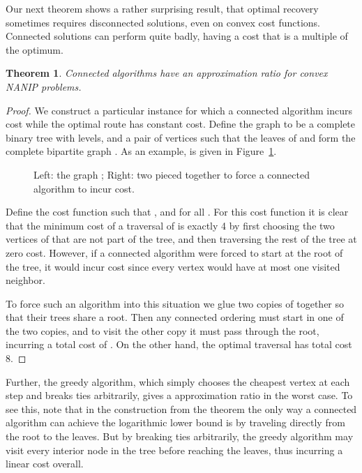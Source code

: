 \documentclass[english]{llncs}
\newtheorem{thm}{Theorem}
\begin{document}
Our next theorem shows a rather surprising result, that optimal recovery
sometimes requires disconnected solutions, even on convex cost functions.
Connected solutions can perform quite badly, having a cost that is a
 multiple of the optimum.

\begin{thm}
Connected algorithms have an approximation ratio  for convex
NANIP problems.
\end{thm}

\begin{proof}

We construct a particular instance for which a connected algorithm incurs cost
 while the optimal route has constant cost. Define the graph
 to be a complete binary tree  with  levels, and a pair of vertices
 such that the leaves of  and  form the complete bipartite
graph . As an example,  is given in Figure~\ref{fig:b3}.

\begin{figure}[th]
\centering
\begin{subfigure}{.5\textwidth}
  \centering
\end{subfigure}\begin{subfigure}{.5\textwidth}
  \centering
\end{subfigure}
\caption{Left: the graph ; Right: two  pieced together to force a
connected algorithm to incur  cost.}
\label{fig:b3}
\end{figure}

Define the cost function  such that , and 
for all . For this cost function it is clear that the minimum cost of
a traversal of  is exactly 4 by first choosing the two vertices of 
that are not part of the tree, and then traversing the rest of the tree at zero
cost. However, if a connected algorithm were forced to start at the root of the
tree, it would incur cost  since every vertex
would have at most one visited neighbor. 

To force such an algorithm into this situation we glue two copies of 
together so that their trees share a root. Then any connected ordering must
start in one of the two copies, and to visit the other copy it must pass
through the root, incurring a total cost of . On the other
hand, the optimal traversal has total cost 8. 

\end{proof}

Further, the greedy algorithm, which simply chooses the cheapest vertex at each
step and breaks ties arbitrarily, gives a  approximation ratio in
the worst case. To see this, note that in the construction from the theorem the
only way a connected algorithm can achieve the logarithmic lower bound is by
traveling directly from the root to the leaves. But by breaking ties
arbitrarily, the greedy algorithm may visit every interior node in the tree
before reaching the leaves, thus incurring a linear cost overall.
\end{document}
